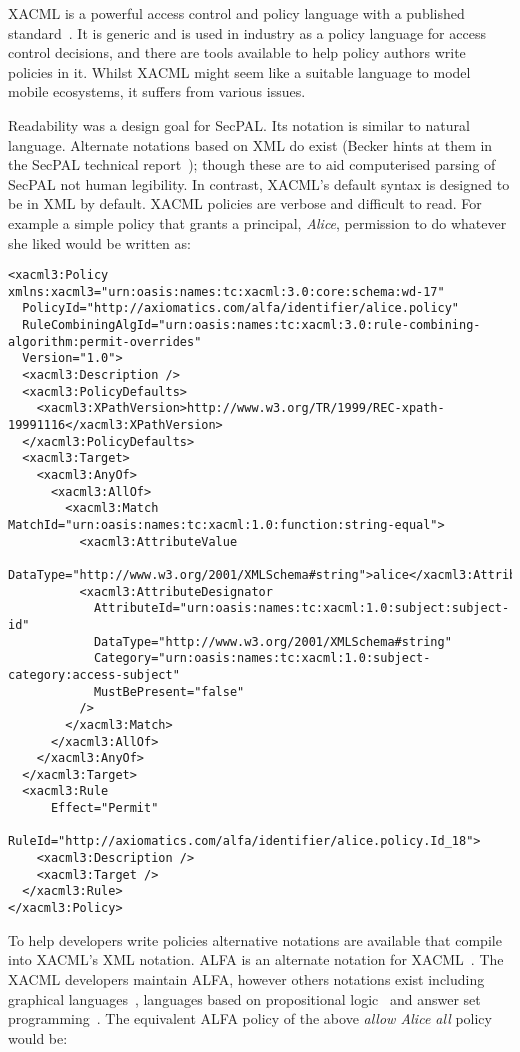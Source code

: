 \documentclass[thesis.tex]{subfiles}
\begin{document}
XACML is a powerful access control and policy language with a published
standard~\cite{oasis_extensible_2013}. It is generic and is used in industry as
a policy language for access control decisions, and there are tools available to
help policy authors write policies in it. Whilst XACML might seem like a
suitable language to model mobile ecosystems, it suffers from various issues.

Readability was a design goal for SecPAL. Its notation is similar to natural
language. Alternate notations based on XML do exist (Becker hints at them in the
SecPAL technical report~\cite{becker_secpal:_2010}); though these are to aid
computerised parsing of SecPAL not human legibility. In contrast, XACML's
default syntax is designed to be in XML by default. XACML policies are verbose and difficult to read.
For example a simple policy that grants a principal, \emph{Alice}, permission to do whatever she liked would be written as:

\begin{lstlisting}
<xacml3:Policy xmlns:xacml3="urn:oasis:names:tc:xacml:3.0:core:schema:wd-17"
  PolicyId="http://axiomatics.com/alfa/identifier/alice.policy"
  RuleCombiningAlgId="urn:oasis:names:tc:xacml:3.0:rule-combining-algorithm:permit-overrides"
  Version="1.0">
  <xacml3:Description />
  <xacml3:PolicyDefaults>
    <xacml3:XPathVersion>http://www.w3.org/TR/1999/REC-xpath-19991116</xacml3:XPathVersion>
  </xacml3:PolicyDefaults>
  <xacml3:Target>
    <xacml3:AnyOf>
      <xacml3:AllOf>
        <xacml3:Match MatchId="urn:oasis:names:tc:xacml:1.0:function:string-equal">
          <xacml3:AttributeValue
            DataType="http://www.w3.org/2001/XMLSchema#string">alice</xacml3:AttributeValue>
          <xacml3:AttributeDesignator 
            AttributeId="urn:oasis:names:tc:xacml:1.0:subject:subject-id"
            DataType="http://www.w3.org/2001/XMLSchema#string"
            Category="urn:oasis:names:tc:xacml:1.0:subject-category:access-subject"
            MustBePresent="false"
          />
        </xacml3:Match>
      </xacml3:AllOf>
    </xacml3:AnyOf>
  </xacml3:Target>
  <xacml3:Rule 
      Effect="Permit"
      RuleId="http://axiomatics.com/alfa/identifier/alice.policy.Id_18">
    <xacml3:Description />
    <xacml3:Target />
  </xacml3:Rule>
</xacml3:Policy>
\end{lstlisting}

To help developers write policies alternative notations are available that
compile into XACML's XML notation. ALFA is an alternate notation for
XACML~\cite{oasis_xacml_technical_comitee_abbreviated_2015}. The XACML
developers maintain ALFA, however others notations exist including graphical
languages~\cite{henrik_nergaard_scratch-based_2015}, languages based on
propositional logic~\cite{zhang_synthesising_2004} and answer set
programming~\cite{ramli_xacml_2012}.  The equivalent ALFA policy of the above \emph{allow Alice all} policy would be:
\end{document}
